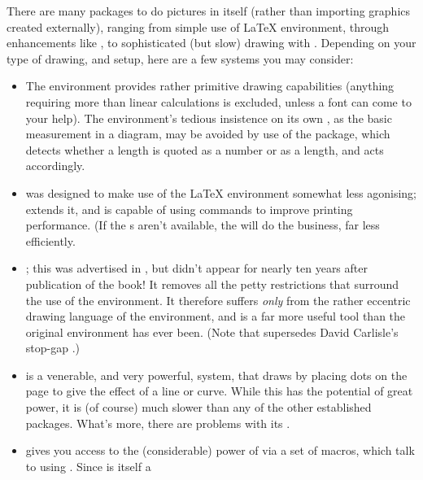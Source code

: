 
There are many packages to do pictures in \AllTeX{} itself (rather than
importing graphics created externally), ranging from simple use of
\LaTeX{}  environment, through enhancements like
, to 
sophisticated (but slow) drawing with \pictex{}. Depending on your type
of drawing, and setup, here are a few systems you may consider:
\begin{itemize}
\item The  environment provides rather primitive
  drawing capabilities (anything requiring more than linear
  calculations is excluded, unless a font can come to your help).  The
  environment's tedious insistence on its own , as the
  basic measurement in a diagram, may be avoided by use of the
   package, which detects whether a length is quoted
  as a number or as a length, and acts accordingly.
\item {} was designed to make use of the \LaTeX{}
   environment somewhat less agonising;
   extends it, and is capable of using 
   commands to improve printing performance.  (If the
  s aren't available, the  will do the
  business, far less efficiently.
\item {}; this was advertised in %
  , but didn't appear for nearly
  ten years after publication of the book!  It removes all the petty
  restrictions that surround the use of the 
  environment.  It therefore suffers \emph{only} from the rather
  eccentric drawing language of the environment, and is a far more
  useful tool than the original environment has ever been.  (Note that
   supersedes David Carlisle's stop-gap
  .)
\item \pictex{} is a venerable, and very powerful, system, that draws
  by placing dots on the page to give the effect of a line or curve.  While
  this has the potential of great power, it is (of course) much slower
  than any of the other established packages.  What's more, there
  are problems with its .
\item {} gives you access to the (considerable) power of
  \PS{} via a set of \tex{} macros, which talk to \PS{} using 
  .  Since \PS{} is itself a

\end{itemize}
